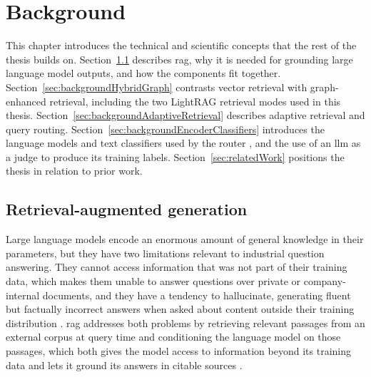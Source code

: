 \documentclass[english, bibtex]{kththesis}               %
\numberwithin{listing}{chapter}
\providecommand{\DIFaddtex}[1]{{\protect\color{blue} \sf #1}} %
\providecommand{\DIFaddbegin}{} %
\providecommand{\DIFaddend}{} %
\providecommand{\DIFadd}[1]{\texorpdfstring{\DIFaddtex{#1}}{#1}} %
\begin{document}
\cleardoublepage
\chapter{Background}
\label{ch:background}

This chapter introduces the technical and scientific concepts that the rest of the thesis builds on. Section~\ref{sec:backgroundRag} describes \gls{rag}, why it is needed for grounding large language model outputs, and how the components fit together. Section~\ref{sec:backgroundHybridGraph} contrasts vector retrieval with graph-enhanced retrieval, including the two LightRAG retrieval modes used in this thesis. Section~\ref{sec:backgroundAdaptiveRetrieval} describes adaptive retrieval and query routing. Section~\ref{sec:backgroundEncoderClassifiers} introduces the language models and text classifiers used by the router\DIFaddbegin \DIFadd{, and the use of an \gls{llm} as a judge to produce its training labels}\DIFaddend . Section~\ref{sec:relatedWork} positions the thesis in relation to prior work.

\section{Retrieval-augmented generation}
\label{sec:backgroundRag}

Large language models encode an enormous amount of general knowledge in their parameters, but they have two limitations relevant to industrial question answering. They cannot access information that was not part of their training data, which makes them unable to answer questions over private or company-internal documents, and they have a tendency to hallucinate, generating fluent but factually incorrect answers when asked about content outside their training distribution \cite{gao2023ragsurvey}. \Gls{rag} addresses both problems by retrieving relevant passages from an external corpus at query time and conditioning the language model on those passages, which both gives the model access to information beyond its training data and lets it ground its answers in citable sources \cite{gao2023ragsurvey,lewis2020rag}.
\end{document}
